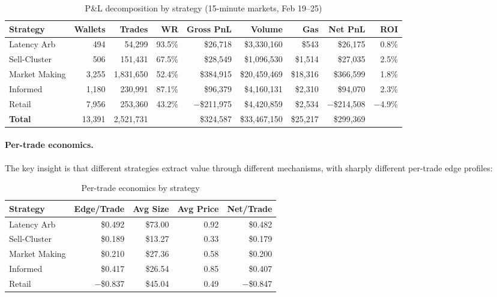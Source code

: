 \documentclass[11pt,a4paper]{article}
\begin{document}
\begin{table}[H]
\centering
\caption{P\&L decomposition by strategy (15-minute markets, Feb 19--25)}
\label{tab:pnl_decomp}
\footnotesize
\begin{tabular}{@{}lrrrrrrrr@{}}
\toprule
\textbf{Strategy} & \textbf{Wallets} & \textbf{Trades} & \textbf{WR} & \textbf{Gross PnL} & \textbf{Volume} & \textbf{Gas} & \textbf{Net PnL} & \textbf{ROI} \\
\midrule
Latency Arb    & 494   & 54,299   & 93.5\%  & \$26,718   & \$3,330,160   & \$543   & \$26,175   & 0.8\% \\
Sell-Cluster   & 506   & 151,431  & 67.5\%  & \$28,549   & \$1,096,530   & \$1,514 & \$27,035   & 2.5\% \\
Market Making  & 3,255 & 1,831,650 & 52.4\% & \$384,915  & \$20,459,469  & \$18,316 & \$366,599 & 1.8\% \\
Informed       & 1,180 & 230,991  & 87.1\%  & \$96,379   & \$4,160,131   & \$2,310 & \$94,070   & 2.3\% \\
Retail         & 7,956 & 253,360  & 43.2\%  & $-$\$211,975 & \$4,420,859 & \$2,534 & $-$\$214,508 & $-$4.9\% \\
\midrule
\textbf{Total} & 13,391 & 2,521,731 &       & \$324,587  & \$33,467,150  & \$25,217 & \$299,369 &       \\
\bottomrule
\end{tabular}
\end{table}

\paragraph{Per-trade economics.} The key insight is that different strategies extract value through different mechanisms, with sharply different per-trade edge profiles:

\begin{table}[H]
\centering
\caption{Per-trade economics by strategy}
\label{tab:pertrade}
\small
\begin{tabular}{@{}lrrrr@{}}
\toprule
\textbf{Strategy} & \textbf{Edge/Trade} & \textbf{Avg Size} & \textbf{Avg Price} & \textbf{Net/Trade} \\
\midrule
Latency Arb  & \$0.492  & \$73.00 & 0.92 & \$0.482 \\
Sell-Cluster & \$0.189  & \$13.27 & 0.33 & \$0.179 \\
Market Making & \$0.210 & \$27.36 & 0.58 & \$0.200 \\
Informed     & \$0.417  & \$26.54 & 0.85 & \$0.407 \\
Retail       & $-$\$0.837 & \$45.04 & 0.49 & $-$\$0.847 \\
\bottomrule
\end{tabular}
\end{table}
\end{document}
